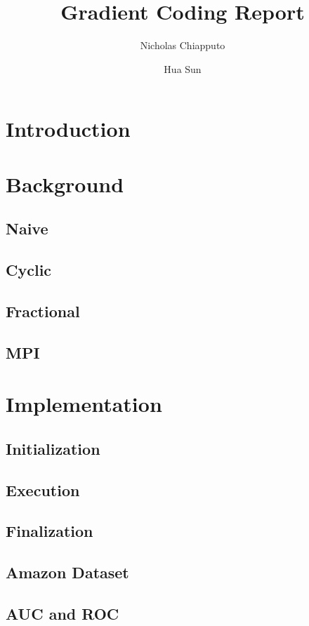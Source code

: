 \documentclass[12pt]{article}
\title{Gradient Coding Report}
\author{
	Nicholas Chiapputo
	\and
	Hua Sun
}
\begin{document}
    \maketitle
    \section{Introduction}
    
    
    \section{Background}
        \subsection{Naive}
        \subsection{Cyclic}
        \subsection{Fractional}
        \subsection{MPI}
    
    \section{Implementation}
        \subsection{Initialization}
        \subsection{Execution}
        \subsection{Finalization}
        \subsection{Amazon Dataset}
        \subsection{AUC and ROC}
    
    
\end{document}

